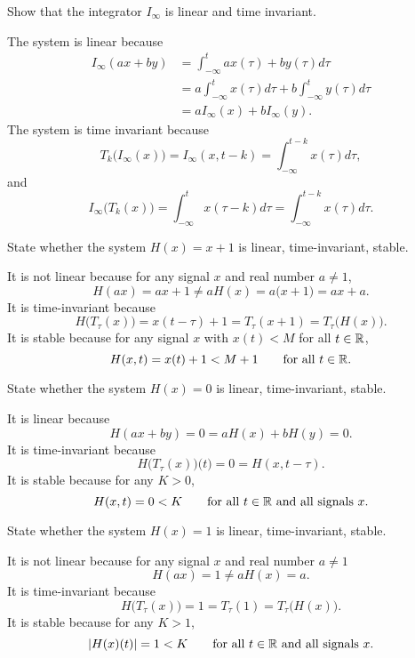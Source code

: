 \begin{excersizelist}
\item Show that the integrator $I_\infty$ is linear and time invariant.
\begin{solution}
The system is linear because
\begin{align*}
I_\infty(ax + by) &= \int_{-\infty}^t ax(\tau) + b y(\tau) d\tau \\
&= a\int_{-\infty}^t x(\tau) d\tau + b \int_{-\infty}^t y(\tau) d\tau \\
&= a I_\infty(x)  + b I_\infty(y).
\end{align*}
The system is time invariant because
\[
T_k\big(I_\infty(x)\big) = I_\infty(x,t-k) = \int_{-\infty}^{t-k} x(\tau) d\tau,
\]
and
\[
I_\infty\big(T_k(x)\big) = \int_{-\infty}^{t} x(\tau-k) d\tau = \int_{-\infty}^{t-k} x(\tau) d\tau.
\]
\end{solution}

\item State whether the system $H(x) = x + 1$ is linear, time-invariant,  stable.
\begin{solution}
It is not linear because for any signal $x$ and real number $a \neq 1$,
\[
H(ax) = ax + 1 \neq aH(x) = a\big( x + 1\big) = ax + a.
\]
It is time-invariant because
\[
H\big(T_{\tau}(x)\big) = x(t - \tau) + 1 = T_\tau(x + 1) = T_\tau\big(H(x)\big).
\]
It is  stable because for any signal $x$ with $x(t) < M$ for all $t\in{\mathbb R}$, 
\[
H(x,t) = x(t) + 1 < M+1 \qquad \text{for all $t \in {\mathbb R}$}. 
\]
\end{solution}

\item State whether the system $H(x) = 0$ is linear, time-invariant,  stable.
\begin{solution}
It is linear because
\[
H(ax + by) = 0 = aH(x) + bH(y) = 0.
\]
It is time-invariant because
\[
H\big(T_{\tau}(x)\big)\big(t\big) = 0 = H(x,t-\tau).
\]
It is stable because for any $K > 0$,
\[
H(x,t) = 0 < K \qquad \text{for all $t \in {\mathbb R}$ and all signals $x$}. 
\]
\end{solution}

\item State whether the system $H(x) = 1$ is linear, time-invariant,  stable.
\begin{solution}
It is not linear because for any signal $x$ and real number $a \neq 1$
\[
H(ax) = 1 \neq  aH(x) = a.
\]
It is time-invariant because
\[
H\big(T_{\tau}(x)\big) = 1 = T_\tau(1) = T_\tau\big(H(x)\big).
\]
It is  stable because for any $K > 1$, 
\[
\left\vert H(x)(t) \right\vert = 1 < K \qquad \text{for all $t \in {\mathbb R}$ and all signals $x$}. 
\]
\end{solution}


\end{excersizelist}
